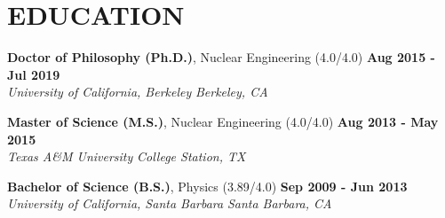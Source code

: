\section{\small{EDUCATION}}

\textbf{Doctor of Philosophy (Ph.D.)}, Nuclear Engineering (4.0/4.0) \hfill \textbf{Aug 2015 - Jul 2019} \\
\textsl{University of California, Berkeley} \hfill \textsl{Berkeley, CA}\\[-2.8ex]
\vspace{-5pt}

\textbf{Master of Science (M.S.)}, Nuclear Engineering (4.0/4.0) \hfill \textbf{Aug 2013 - May 2015} \\
\textsl{Texas A\&M University} \hfill \textsl{College Station, TX}\\[-2.8ex]
\vspace{-5pt}

\textbf{Bachelor of Science (B.S.)}, Physics (3.89/4.0) \hfill \textbf{Sep 2009 - Jun 2013} \\
\textsl{University of California, Santa Barbara} \hfill \textsl{Santa Barbara, CA}\\[-2.8ex]
